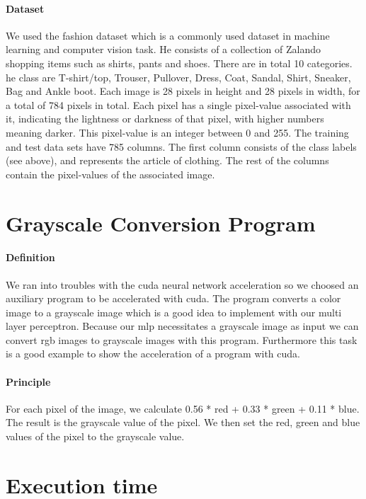 \documentclass[11pt]{article}
\begin{document}
\paragraph*{Dataset} We used the fashion dataset which is a commonly used dataset in machine learning and computer vision task.
He consists of a collection of Zalando shopping items such as shirts, pants and shoes. There are in total 10 categories.
he class are T-shirt/top, Trouser, Pullover, Dress, Coat, Sandal, Shirt, Sneaker, Bag and Ankle boot.
Each image is 28 pixels in height and 28 pixels in width, for a total of 784 pixels in total.
Each pixel has a single pixel-value associated with it, indicating the lightness or darkness of that pixel, with higher numbers meaning darker.
This pixel-value is an integer between 0 and 255. The training and test data sets have 785 columns.
The first column consists of the class labels (see above), and represents the article of clothing.
The rest of the columns contain the pixel-values of the associated image.

\section{Grayscale Conversion Program}

\paragraph*{Definition} We ran into troubles with the cuda neural network acceleration so we choosed an auxiliary program to be accelerated with cuda.
The program converts a color image to a grayscale image which is a good idea to implement with our multi layer perceptron.
Because our mlp necessitates a grayscale image as input we can convert rgb images to grayscale images with this program.
Furthermore this task is a good example to show the acceleration of a program with cuda.

\paragraph*{Principle} For each pixel of the image, we calculate 0.56 * red + 0.33 * green + 0.11 * blue.
The result is the grayscale value of the pixel. We then set the red, green and blue values of the pixel to the grayscale value.

\pagebreak


\section{Execution time}
\end{document}
